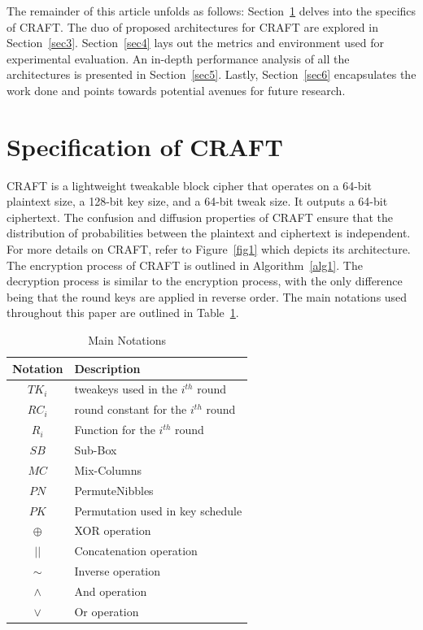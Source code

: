 \documentclass[final,5p,times,twocolumn]{elsarticle}
\begin{document}
The remainder of this article unfolds as follows: Section~\ref{sec2} delves into the specifics of CRAFT. The duo of proposed architectures for CRAFT are explored in Section~\ref{sec3}. Section~\ref{sec4} lays out the metrics and environment used for experimental evaluation. An in-depth performance analysis of all the architectures is presented in Section~\ref{sec5}. Lastly, Section~\ref{sec6} encapsulates the work done and points towards potential avenues for future research.

\section{Specification of CRAFT}\label{sec2}

CRAFT is a lightweight tweakable block cipher that operates on a 64-bit plaintext size, a 128-bit key size, and a 64-bit tweak size.
It outputs a 64-bit ciphertext.
The confusion and diffusion properties of CRAFT ensure that the distribution of probabilities between the plaintext and ciphertext is independent.
For more details on CRAFT, refer to Figure~\ref{fig1} which depicts its architecture.
The encryption process of CRAFT is outlined in Algorithm~\ref{alg1}.
The decryption process is similar to the encryption process, with the only difference being that the round keys are applied in reverse order.
The main notations used throughout this paper are outlined in Table~\ref{tab1}.


\begin{table}[h]
    \centering
    \caption{Main Notations}\label{tab1}%
    \begin{tabular}{|c|l|}
        \hline
        Notation & Description                           \\
        \hline
        $TK_i$   & tweakeys used in the $i^{th}$ round   \\
        $RC_i$   & round constant for the $i^{th}$ round \\
        $R_i$    & Function for the $i^{th}$ round       \\
        $SB$     & Sub-Box                               \\
        $MC$     & Mix-Columns                           \\
        $PN$     & PermuteNibbles                        \\
        $PK$     & Permutation used in key schedule      \\
        $\oplus$ & XOR operation                         \\
        $||$     & Concatenation operation               \\
        $\sim$   & Inverse operation                     \\
        $\land$  & And operation                         \\
        $\lor$   & Or operation                          \\
        \hline
    \end{tabular}
\end{table}
\end{document}
